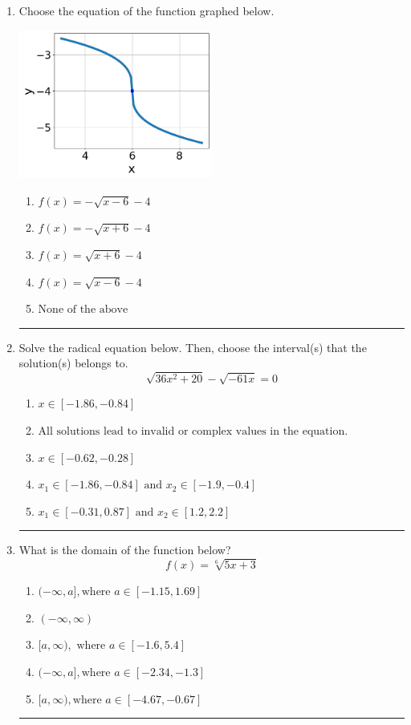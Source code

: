 \documentclass[14pt]{extbook}
\newcommand{\litem}[1]{\item#1\hspace*{-1cm}\rule{\textwidth}{0.4pt}}
\begin{document}
\begin{enumerate}
{\begin{enumerate}[label=\Alph*.]
\end{enumerate} }
\litem{
Choose the equation of the function graphed below.
\begin{center}
    \includegraphics[width=0.5\textwidth]{../Figures/radicalGraphToEquationCopyA.png}
\end{center}
\begin{enumerate}[label=\Alph*.]
\item \( f(x) = - \sqrt{x - 6} - 4 \)
\item \( f(x) = - \sqrt{x + 6} - 4 \)
\item \( f(x) = \sqrt{x + 6} - 4 \)
\item \( f(x) = \sqrt{x - 6} - 4 \)
\item \( \text{None of the above} \)

\end{enumerate} }
\litem{
Solve the radical equation below. Then, choose the interval(s) that the solution(s) belongs to.\[ \sqrt{36 x^2 + 20} - \sqrt{-61 x} = 0 \]\begin{enumerate}[label=\Alph*.]
\item \( x \in [-1.86,-0.84] \)
\item \( \text{All solutions lead to invalid or complex values in the equation.} \)
\item \( x \in [-0.62,-0.28] \)
\item \( x_1 \in [-1.86, -0.84] \text{ and } x_2 \in [-1.9,-0.4] \)
\item \( x_1 \in [-0.31, 0.87] \text{ and } x_2 \in [1.2,2.2] \)

\end{enumerate} }
\litem{
What is the domain of the function below?\[ f(x) = \sqrt[6]{5 x + 3} \]\begin{enumerate}[label=\Alph*.]
\item \( (-\infty, a], \text{where } a \in [-1.15, 1.69] \)
\item \( (-\infty, \infty) \)
\item \( [a, \infty), \text{ where } a \in [-1.6, 5.4] \)
\item \( (-\infty, a], \text{where } a \in [-2.34, -1.3] \)
\item \( [a, \infty), \text{where } a \in [-4.67, -0.67] \)


\end{enumerate}}
\end{enumerate}
\end{document}
